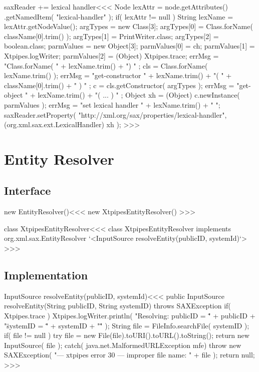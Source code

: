 \documentclass{article}
\begin{document}
\<saxReader += lexical handler\><<<
Node lexAttr = node.getAttributes()
                  .getNamedItem( "lexical-handler" );
if( lexAttr != null ){
   String lexName = lexAttr.getNodeValue();   
   argTypes = new Class[3]; 
   argTypes[0] = Class.forName( className[0].trim() ); 
   argTypes[1] = PrintWriter.class;  
   argTypes[2] = boolean.class; 
   parmValues = new Object[3]; 
   parmValues[0] = ch; 
   parmValues[1] = Xtpipes.logWriter; 
   parmValues[2] = (Object) Xtpipes.trace; 
   errMsg = "Class.forName( " + lexName.trim() + ") " ;
   cls = Class.forName( lexName.trim() );
   errMsg = "get-constructor " + 
                lexName.trim() +
                "( " + className[0].trim() + " ) " ;
   c = cls.getConstructor( argTypes ); 
   errMsg = "get-object " + 
               lexName.trim() + "( ... ) " ;
   Object xh = (Object) c.newInstance( parmValues );   
   errMsg = "set lexical handler " + lexName.trim() + " ";  
   saxReader.setProperty(
       "http://xml.org/sax/properties/lexical-handler",
       (org.xml.sax.ext.LexicalHandler) xh
    );
}
>>>










\section{Entity Resolver}


\subsection{Interface}




\<new EntityResolver()\><<<
new XtpipesEntityResolver()
>>>

\<class XtpipesEntityResolver\><<<
class XtpipesEntityResolver implements  org.xml.sax.EntityResolver { 
   `<InputSource resolveEntity(publicID, systemId)`>
}
>>>


\subsection{Implementation}



\<InputSource resolveEntity(publicID, systemId)\><<<
public InputSource resolveEntity(String publicID, String systemID) 
                                                    throws SAXException {    
   if( Xtpipes.trace ){ 
      Xtpipes.logWriter.println( "Resolving: publicID = \" " + publicID
                + "\"  systemID = \"" + systemID + "\"" ); 
   } 
   String file = FileInfo.searchFile( systemID );
   if( file != null ){ 
     try{
        file = new File(file).toURI().toURL().toString();
        return new InputSource( file ); 
     } catch( java.net.MalformedURLException mfe){
        throw new SAXException(  
          "--- xtpipes error 30 --- improper file name: " + file  );  
   } }
   return null; 
}  
>>>
\end{document}
